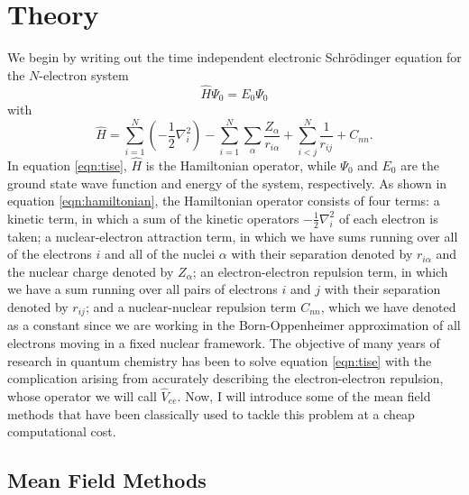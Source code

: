 \documentclass[12pt]{caltech_thesis}
\begin{document}
\chapter{Theory}
We begin by writing out the time independent electronic Schrödinger equation for the $N$-electron system
\begin{equation}
    \hat{H}\Psi_0 =E_0\Psi_0 
\label{eqn:tise}
\end{equation}
with
\begin{equation}
\hat{H}=\sum_{i=1}^N\left(-\frac{1}{2} \nabla_i^2\right)-\sum_{i=1}^N \sum_{\alpha }\frac{Z_{\alpha }}{r_{i\alpha }}+\sum_{i<j}^N \frac{1}{r_{i j}} + C_{nn}.
\label{eqn:hamiltonian}
\end{equation}
In equation \ref{eqn:tise}, $\hat{H}$ is the Hamiltonian operator, while $\Psi_0$ and $E_0$ are the ground state wave function and energy of the system, respectively. As shown in equation \ref{eqn:hamiltonian}, the Hamiltonian operator consists of four terms: a kinetic term, in which a sum of the kinetic operators $-\frac{1}{2} \nabla_i^2$ of each electron is taken; a nuclear-electron attraction term, in which we have sums running over all of the electrons $i$ and all of the nuclei $\alpha$ with their separation denoted by $r_{i\alpha}$ and the nuclear charge denoted by $Z_{\alpha}$; an electron-electron repulsion term, in which we have a sum running over all pairs of electrons $i$ and $j$ with their separation denoted by $r_{ij}$; and a nuclear-nuclear repulsion term $C_{nn}$, which we have denoted as a constant since we are working in the Born-Oppenheimer approximation of all electrons moving in a fixed nuclear framework.
The objective of many years of research in quantum chemistry has been to solve equation \ref{eqn:tise} with the complication arising from accurately describing the electron-electron repulsion, whose operator we will call $\hat{V}_{ee}$.
Now, I will introduce some of the mean field methods that have been classically used to tackle this problem at a cheap computational cost.
\section{Mean Field Methods}
\end{document}
